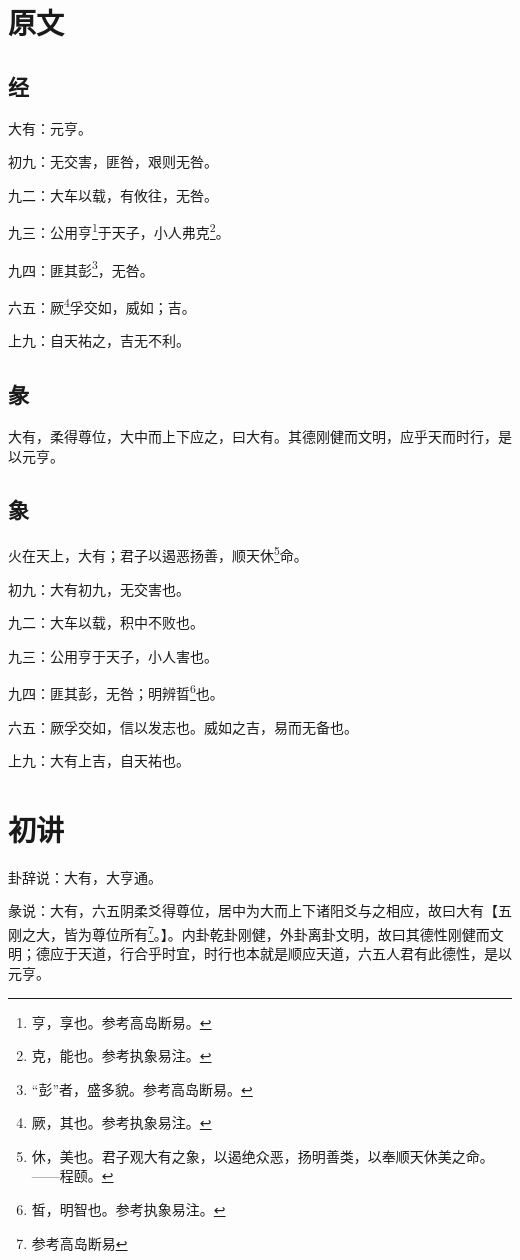 \documentclass[12pt,oneside]{book}
\begin{document}
\section{原文}

\subsection{经}
大有：元亨。

初九：无交害，匪咎，艰则无咎。

九二：大车以载，有攸往，无咎。

九三：公用亨\footnote{亨，享也。参考高岛断易。}于天子，小人弗克\footnote{克，能也。参考执象易注。}。

九四：匪其彭\footnote{“彭”者，盛多貌。参考高岛断易。}，无咎。

六五：厥\footnote{厥，其也。参考执象易注。}孚交如，威如；吉。

上九：自天祐之，吉无不利。

\subsection{彖}
大有，柔得尊位，大中而上下应之，曰大有。其德刚健而文明，应乎天而时行，是以元亨。

\subsection{象}
火在天上，大有；君子以遏恶扬善，顺天休\footnote{休，美也。君子观大有之象，以遏绝众恶，扬明善类，以奉顺天休美之命。——程颐。}命。

初九：大有初九，无交害也。

九二：大车以载，积中不败也。

九三：公用亨于天子，小人害也。

九四：匪其彭，无咎；明辨晢\footnote{皙，明智也。参考执象易注。}也。

六五：厥孚交如，信以发志也。威如之吉，易而无备也。

上九：大有上吉，自天祐也。


\section{初讲}
卦辞说：大有，大亨通。

彖说：大有，六五阴柔爻得尊位，居中为大而上下诸阳爻与之相应，故曰大有【五刚之大，皆为尊位所有\footnote{参考高岛断易}。】。内卦乾卦刚健，外卦离卦文明，故曰其德性刚健而文明；德应于天道，行合乎时宜，时行也本就是顺应天道，六五人君有此德性，是以元亨。
\end{document}
